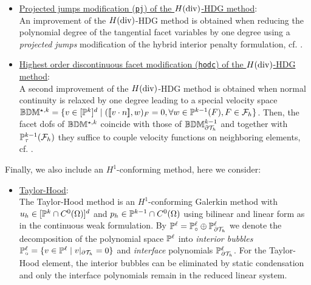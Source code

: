 \documentclass[pdflatex,sn-mathphys,Numbered]{sn-jnl}%
\theoremstyle{remark}%
\theoremstyle{definition}%
\begin{document}
\begin{itemize}
  Then, the interior normal-bubbles (which determine the higher order divergence of the velocity) can be statically condensated alongside the higher order pressures. Only the facet variables (normal \texttt{dof} of the $\BDM_{\partial \Th}^k$ space and the tangential vector functions in $\PP_\tau^k(\Fh)$) and the piecewise constant pressure functions in $\PP^0(\Th)$ remain in the global linear system.
  \item \underline{Projected jumps modification (\texttt{pj}) of the $H(\operatorname{\mathrm{div}})$-HDG method}: \\[0.4ex] An improvement of the $H(\operatorname{\mathrm{div}})$-HDG method is obtained when reducing the polynomial degree of the tangential facet variables by one degree using a \emph{projected jumps} modification of the hybrid interior penalty formulation, cf. \cite{LS_CMAME_2016}.
  \item \underline{Highest order discontinuous facet modification (\texttt{hodc}) of the $H(\operatorname{\mathrm{div}})$-HDG method}: \\[0.4ex] A second improvement of the $H(\operatorname{\mathrm{div}})$-HDG method is obtained when normal continuity is relaxed by one degree leading to a special velocity space $\mathbb{B}\mathbb{D}\mathbb{M}^{\star,k} = \{ v \in [\mathbb{P}^k]^d \mid ([\![v \cdot n]\!],w)_F = 0, \forall w \in \mathbb{P}^{k-1}(F), F \in {\mathcal{F}_h}\}$. Then, the facet dofs of $\mathbb{B}\mathbb{D}\mathbb{M}^{\star,k}$ coincide with those of $\mathbb{B}\mathbb{D}\mathbb{M}_{\partial {\mathcal{T}_h}}^{k-1}$ and together with $\mathbb{P}_\tau^{k-1}({\mathcal{F}_h})$ they suffice to couple velocity functions on neighboring elements, cf. \cite{LLS_SIAM_2017,LLS_ESAIM_2019}. 
\end{itemize}    
%
Finally, we also include an $H^1$-conforming method, here we consider:
\begin{itemize}
    \item \underline{Taylor-Hood}: \\[0.4ex] The Taylor-Hood method is an $H^1$-conforming Galerkin method with $u_h \in [\mathbb{P}^k \cap C^0(\Omega)]^d$ and $p_h \in \mathbb{P}^{k-1} \cap C^0(\Omega)$ using bilinear and linear form as in the continuous weak formulation. 
    By $\mathbb{P}^\ell = \mathbb{P}_{\circ}^\ell \oplus \mathbb{P}_{\partial {\mathcal{T}_h}}^\ell$ we denote the decomposition of the polynomial space $\mathbb{P}^\ell$ into \emph{interior bubbles} $\mathbb{P}_{\circ}^\ell = \{v \in \mathbb{P}^\ell \mid v|_{\partial {\mathcal{T}_h}} = 0\}$ and \emph{interface} polynomials $\mathbb{P}_{\partial {\mathcal{T}_h}}^\ell$.
    For the Taylor-Hood element, the interior bubbles can be eliminated by static condensation and only the interface polynomials remain in the reduced linear system. 
\end{itemize}    
\end{document}
